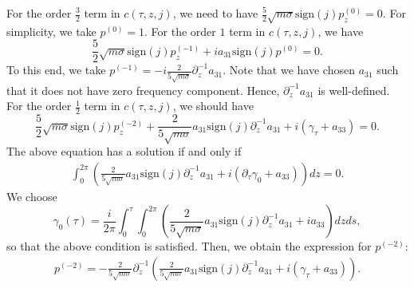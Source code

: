 \documentclass[12pt]{amsart}
\theoremstyle{remark}
\theoremstyle{definition}
\numberwithin{equation}{section}
\newcommand{\p}{\partial}
\newcommand{\f}{\frac}
\begin{document}
For the order $\f32$ term in $c(\tau,z,j)$, we need to have $\f52\sqrt{m\sigma}\text{sign}(j)p_z^{(0)}=0$. 
For simplicity, we take $p^{(0)}=1$.
For the order $1$ term in $c(\tau,z,j)$, we  have \[\f5{2}\sqrt{m\sigma}\text{sign}(j)p_z^{(-1)} +ia_{31}\text{sign}(j)p^{(0)}=0.\]
To this end, we take $p^{(-1)}=-i\f2{5\sqrt{m\sigma}}\p_z^{-1}a_{31}$.
Note that we have chosen $a_{31}$ such that it does not have zero frequency component. 
Hence, $\p_z^{-1}a_{31}$ is well-defined.
For the order $\f12$ term in $c(\tau,z,j)$, we should have 
\[\f52\sqrt{m\sigma}\text{sign}(j)p_z^{(-2)} +\f{2}{5\sqrt{m\sigma}}a_{31}\text{sign}(j)\p_z^{-1}a_{31}+i(\gamma_{\tau}+a_{33})=0.\] 
The above equation has a solution  if and only if
\begin{align*}
\int_0^{2\pi}\left(\f2{5\sqrt{m\sigma}}a_{31}\text{sign}(j)\p_z^{-1}a_{31}+i(\p_\tau\gamma_0+a_{33})\right)dz=0.
\end{align*}
We choose 
\[
\gamma_0(\tau)=\f{i}{2\pi}\int_0^{\tau}\int_0^{2\pi}\left(\f{2}{5\sqrt{m\sigma}}a_{31}\text{sign}(j)\p_z^{-1}a_{31}+ia_{33}\right)dzds,\]
so that the above condition is satisfied. 
Then, we obtain the expression for $p^{(-2)}$:
\begin{align*}
p^{(-2)}=-\f2{5\sqrt{m\sigma}}\p^{-1}_z\left(\f{2}{5\sqrt{m\sigma}}a_{31}\text{sign}(j)\p_z^{-1}a_{31}+i(\gamma_{\tau}+a_{33})\right).
\end{align*}
\end{document}
